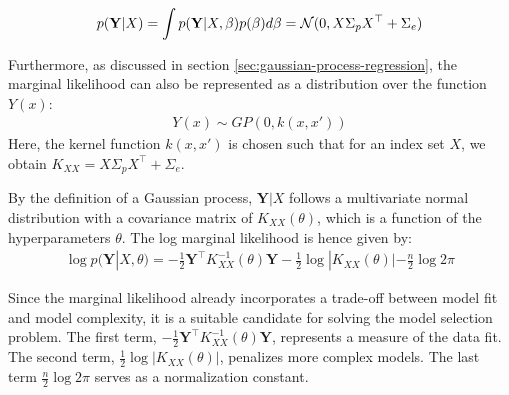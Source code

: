 \begin{gather}\label{eq:marginal-likelihood2}
    p(\mathbf{Y}|X) = \int p(\mathbf{Y}|X,\beta) p(\beta) d\beta = \operatorname{\mathcal{N}}(0, X \Sigma_p X^{\top} + \Sigma_e)
\end{gather}

Furthermore, as discussed in section \ref{sec:gaussian-process-regression},
the marginal likelihood can also be represented as a distribution over the function $Y(x)$:
\begin{gather*}
    Y(x) \sim GP(0, k(x, x'))
\end{gather*}
Here, the kernel function $k(x, x')$ is chosen such that for an index set $X$,
we obtain $K_{XX} = X \Sigma_p X^{\top} + \Sigma_e$.

By the definition of a Gaussian process, $\mathbf{Y}|X$ follows a multivariate normal distribution
with a covariance matrix of $K_{XX}(\theta)$, which is a function of the hyperparameters $\theta$.
The log marginal likelihood is hence given by:
\begin{gather}\label{eq:gaussian-marginal-likelihood}
    \log p(\mathbf{Y} | X, \theta) = - \frac{1}{2} \mathbf{Y}^{\top} K_{XX}^{-1}(\theta) \mathbf{Y} -
    \frac{1}{2} \log |K_{XX}(\theta)| - \frac{n}{2} \log 2 \pi
\end{gather}

Since the marginal likelihood already incorporates a trade-off between model fit and
model complexity, it is a suitable candidate for solving the model selection problem.
The first term, $- \frac{1}{2} \mathbf{Y}^{\top} K_{XX}^{-1}(\theta) \mathbf{Y}$,
represents a measure of the data fit. The second term, $\frac{1}{2} \log |K_{XX}(\theta)|$,
penalizes more complex models. The last term $\frac{n}{2} \log 2 \pi$ serves as a normalization constant.










%
%
%
%
%
%
%




%
%



